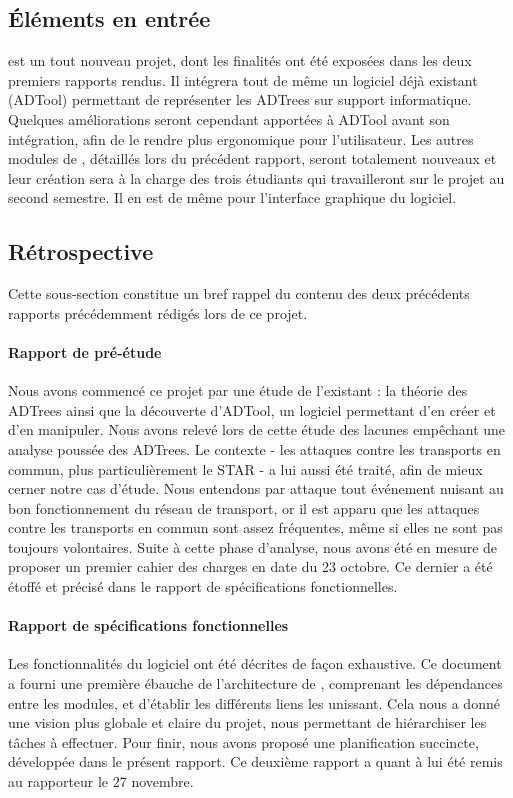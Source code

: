     \subsection{Éléments en entrée}
        \glasir{} est un tout nouveau projet, dont les finalités ont été exposées dans les deux premiers rapports rendus. Il intégrera tout de même un logiciel déjà existant (ADTool) permettant de représenter les ADTrees sur support informatique. Quelques améliorations seront cependant apportées à ADTool avant son intégration, afin de le rendre plus ergonomique pour l'utilisateur. Les autres modules de \glasir{}, détaillés lors du précédent rapport, seront totalement nouveaux et leur création sera à la charge des trois étudiants qui travailleront sur le projet au second semestre. Il en est de même pour l'interface graphique du logiciel.

    \subsection{Rétrospective} 
        Cette sous-section constitue un bref rappel du contenu des deux précédents rapports précédemment rédigés lors de ce projet.

        \paragraph{Rapport de pré-étude} %
         Nous avons commencé ce projet par une étude de l'existant : la théorie des ADTrees ainsi que la découverte d'ADTool, un logiciel permettant d'en créer et d'en manipuler. Nous avons relevé lors de cette étude des lacunes empêchant une analyse poussée des ADTrees. Le contexte - les attaques contre les transports en commun, plus particulièrement le STAR - a lui aussi été traité, afin de mieux cerner notre cas d'étude. Nous entendons par \og attaque \fg{} tout événement nuisant au bon fonctionnement du réseau de transport, or il est apparu que les attaques contre les transports en commun sont assez fréquentes, même si elles ne sont pas toujours volontaires. Suite à cette phase d'analyse, nous avons été en mesure de proposer un premier cahier des charges en date du 23 octobre. Ce dernier a été étoffé et précisé dans le rapport de spécifications fonctionnelles. %

        \paragraph{Rapport de spécifications fonctionnelles} %
        Les fonctionnalités du logiciel ont été décrites de façon exhaustive. Ce document a fourni une première ébauche de l'architecture de \glasir{}, comprenant les dépendances entre les modules, et d'établir les différents liens les unissant. Cela nous a donné une vision plus globale et claire du projet, nous permettant de hiérarchiser les tâches à effectuer. Pour finir, nous avons proposé une planification succincte, développée dans le présent rapport. Ce deuxième rapport a quant à lui été remis au rapporteur le 27 novembre.

